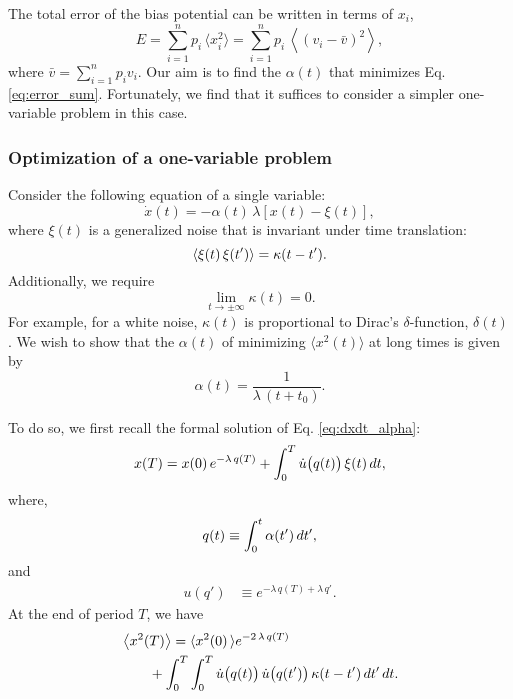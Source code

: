 \documentclass[reprint, floatfix]{revtex4-1}
\newcommand{\Err}{E}
\begin{document}
The total error of the bias potential can be written in
terms of $x_i$,
\begin{equation}
\Err
=
\sum_{i = 1}^n p_i \, \langle x_i^2 \rangle
=
\sum_{i = 1}^n p_i \, \left\langle (v_i - \bar v)^2 \right\rangle,
\label{eq:error_sum}
\end{equation}
where
$\bar v = \sum_{i = 1}^n p_i v_i$.
%
Our aim is to find the $\alpha(t)$
that minimizes Eq. \eqref{eq:error_sum}.
%
Fortunately, we find that it suffices to consider
a simpler one-variable problem
in this case.



\subsubsection{Optimization of a one-variable problem}



Consider the following equation
of a single variable:
%
\begin{equation}
\dot x(t) = -\alpha(t) \, \lambda \left[ x(t) - \xi(t) \right],
\label{eq:dxdt_alpha}
\end{equation}
%
where $\xi(t)$ is a generalized noise
that is invariant under time translation:
%
\begin{equation}
\left\langle \xi(t) \, \xi(t') \right\rangle
=
\kappa(t - t').
\notag
\end{equation}
%
Additionally, we require
\begin{equation}
  \lim_{t \rightarrow \pm\infty} \kappa(t) = 0.
  \label{eq:kappa_limit}
\end{equation}
%
For example, for a white noise,
$\kappa(t)$ is proportional to
Dirac's $\delta$-function, $\delta(t)$.
%
We wish to show that the $\alpha(t)$
of minimizing $\langle x^2(t) \rangle$ at long times
is given by
%
\begin{equation}
  \alpha(t) = \frac{1}{\lambda \, (t + t_0)}.
\label{eq:alpha_opt}
\end{equation}



To do so, we first recall
the formal solution of Eq. \eqref{eq:dxdt_alpha}:
%
\begin{equation}
x(T)
=
x(0) \, e^{-\lambda \, q(T)}
+
\int_0^T
  \dot u\bigl( q(t) \bigr) \, \xi(t) \, dt,
\notag
\end{equation}
%
where,
%
\begin{equation}
q(t) \equiv \int_0^t \alpha(t') \, dt',
\notag
\end{equation}
%
and
%
\begin{align}
u(q')
&\equiv
e^{-\lambda \, q(T) + \lambda \, q'}.
\label{eq:u_def}
\end{align}
At the end of period $T$, we have
\begin{align}
&\left\langle x^2(T) \right\rangle
=
\langle x^2(0) \,
\rangle e^{-2 \, \lambda \, q(T)}
\notag
\\
&\qquad
+
\int_0^T \int_0^T
  \dot u\bigl( q(t) \bigr) \,
  \dot u\bigl( q(t') \bigr) \,
  \kappa(t - t') \, dt' \, dt.
\label{eq:x2t_average}
\end{align}
\end{document}
